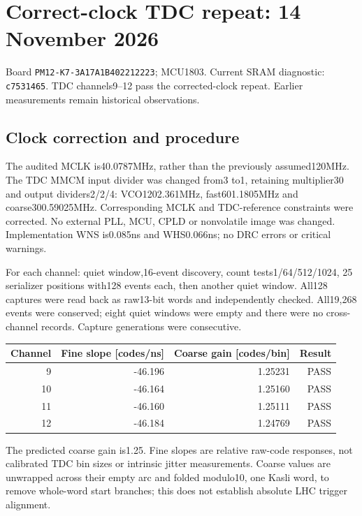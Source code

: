 \clearpage
\section{Correct-clock TDC repeat: 14 November 2026}
Board \texttt{PM12-K7-3A17A1B402212223}; MCU1803.
Current SRAM diagnostic: \texttt{c7531465}. TDC channels9--12 pass the
corrected-clock repeat. Earlier measurements remain historical observations.

\subsection{Clock correction and procedure}
The audited MCLK is40.0787MHz, rather than the previously assumed120MHz.
The TDC MMCM input divider was changed from3 to1, retaining multiplier30
and output dividers2/2/4: VCO1202.361MHz, fast601.1805MHz and
coarse300.59025MHz. Corresponding MCLK and TDC-reference constraints were
corrected. No external PLL, MCU, CPLD or nonvolatile image was changed.
Implementation WNS is0.085ns and WHS0.066ns; no DRC errors or critical warnings.

For each channel: quiet window,16-event discovery, count tests1/64/512/1024,
25 serializer positions with128 events each, then another quiet window.
All128 captures were read back as raw13-bit words and independently checked.
All19,268 events were conserved; eight quiet windows were empty and there
were no cross-channel records. Capture generations were consecutive.

\begin{center}
\begin{tabular}{rrrr}\toprule
Channel & Fine slope [codes/ns] & Coarse gain [codes/bin] & Result\\\midrule
9 & -46.196 & 1.25231 & PASS\\
10 & -46.164 & 1.25160 & PASS\\
11 & -46.160 & 1.25111 & PASS\\
12 & -46.184 & 1.24769 & PASS\\\bottomrule
\end{tabular}
\end{center}
The predicted coarse gain is1.25. Fine slopes are relative raw-code responses,
not calibrated TDC bin sizes or intrinsic jitter measurements. Coarse values
are unwrapped across their empty arc and folded modulo10, one Kasli word,
to remove whole-word start branches; this does not establish absolute LHC
trigger alignment.

